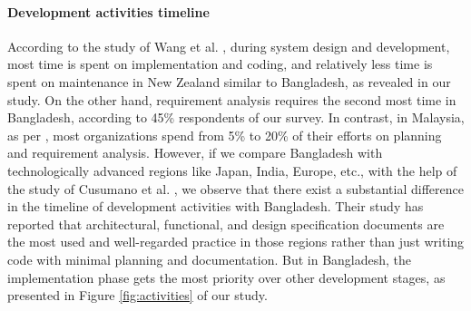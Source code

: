 \paragraph{Development activities timeline}
According to the study of Wang et al. \citep{Wang2018}, during system design and development, most time is spent on implementation and coding, and relatively less time is spent on maintenance in New Zealand similar to Bangladesh, as revealed in our study. On the other hand, requirement analysis requires the second most time in Bangladesh, according to 45\% respondents of our survey. In contrast, in Malaysia, as per \citep{Baharom2006}, most organizations spend from 5\% to 20\% of their efforts on planning and requirement analysis. However, if we compare Bangladesh with technologically advanced regions like Japan, India, Europe, etc., with the help of the study of Cusumano et al. \citep{Cusumano2003}, we observe that there exist a substantial difference in the timeline of development activities with Bangladesh. Their study has reported that architectural, functional, and design specification documents are the most used and well-regarded practice in those regions rather than just writing code with minimal planning and documentation. But in Bangladesh, the implementation phase gets the most priority over other development stages, as presented in Figure \ref{fig:activities} of our study.